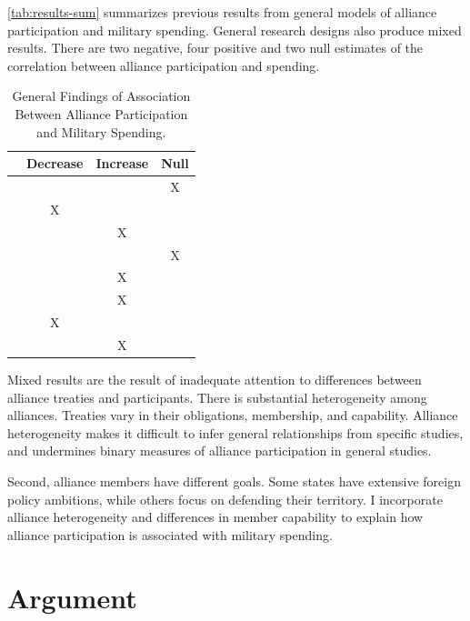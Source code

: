 \documentclass[12pt]{article}
\begin{document}
\autoref{tab:results-sum} summarizes previous results from general models of alliance participation and military spending. 
General research designs also produce mixed results. 
There are two negative, four positive and two null estimates of the correlation between alliance participation and spending. 


\begin{table}[hbt!]
\begin{center}
\begin{tabular}{lccc}
     & Decrease & Increase & Null \\
\hline
\citet{MostSiverson1987} &  &  & X \\
\citet{Conybeare1994} & X & &  \\
\citet{Diehl1994} &  & X &  \\
\citet{Goldsmith2003} &  &  & X \\
\citet{MorganPalmer2006} &  & X & \\ 
\citet{QuirozFlores2011} &  & X &  \\ 
\citet{DigiuseppePoast2016} & X &  & \\ 
\citet{Horowitzetal2017} &  & X & \\ 
\hline
\end{tabular}
\caption{General Findings of Association Between Alliance Participation and Military Spending.}
\label{tab:results-sum}
\end{center} 
\end{table}


Mixed results are the result of inadequate attention to differences between alliance treaties and participants.
There is substantial heterogeneity among alliances.
Treaties vary in their obligations, membership, and capability. 
Alliance heterogeneity makes it difficult to infer general relationships from specific studies, and undermines binary measures of alliance participation in general studies. 
 

Second, alliance members have different goals.
Some states have extensive foreign policy ambitions, while others focus on defending their territory. 
I incorporate alliance heterogeneity and differences in member capability to explain how alliance participation is associated with military spending. 



\section{Argument}
\end{document}
